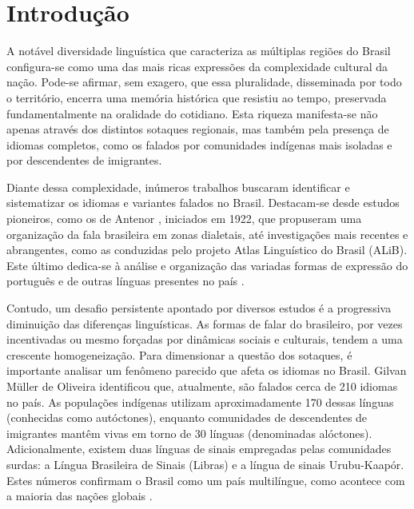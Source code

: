  \chapter{Introdução} %

\begin{flushleft}


A notável diversidade linguística que caracteriza as múltiplas regiões do Brasil configura-se como uma das mais ricas expressões da complexidade cultural da nação. Pode-se afirmar, sem exagero, que essa pluralidade, disseminada por todo o território, encerra uma memória histórica que resistiu ao tempo, preservada fundamentalmente na oralidade do cotidiano. Esta riqueza manifesta-se não apenas através dos distintos sotaques regionais, mas também pela presença de idiomas completos, como os falados por comunidades indígenas mais isoladas e por descendentes de imigrantes.

Diante dessa complexidade, inúmeros trabalhos buscaram identificar e sistematizar os idiomas e variantes falados no Brasil. Destacam-se desde estudos pioneiros, como os de Antenor \cite{nascentes1953}, iniciados em 1922, que propuseram uma organização da fala brasileira em zonas dialetais, até investigações mais recentes e abrangentes, como as conduzidas pelo projeto Atlas Linguístico do Brasil (ALiB). Este último dedica-se à análise e organização das variadas formas de expressão do português e de outras línguas presentes no país \cite{cardoso2014alib, Aguilera2022}.

Contudo, um desafio persistente apontado por diversos estudos é a progressiva diminuição das diferenças linguísticas. As formas de falar do brasileiro, por vezes incentivadas ou mesmo forçadas por dinâmicas sociais e culturais, tendem a uma crescente homogeneização. Para dimensionar a questão dos sotaques, é importante analisar um fenômeno parecido que afeta os idiomas no Brasil. Gilvan Müller de Oliveira identificou que, atualmente, são falados cerca de 210 idiomas no país. As populações indígenas utilizam aproximadamente 170 dessas línguas (conhecidas como autóctones), enquanto comunidades de descendentes de imigrantes mantêm vivas em torno de 30 línguas (denominadas alóctones). Adicionalmente, existem duas línguas de sinais empregadas pelas comunidades surdas: a Língua Brasileira de Sinais (Libras) e a língua de sinais Urubu-Kaapór. Estes números confirmam o Brasil como um país multilíngue, como acontece com a maioria das nações globais \cite{noauthor_plurilinguismo_nodate}.


\end{flushleft}
